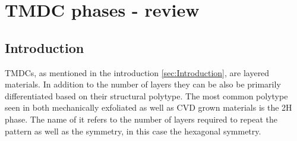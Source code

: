 \section{TMDC phases - review}

\subsection{Introduction}

TMDCs, as mentioned in the introduction \ref{sec:Introduction}, are layered materials. In addition to the number of layers they can be also be primarily differentiated based on their structural polytype. The most common polytype seen in both mechanically exfoliated as well as CVD grown materials is the 2H phase. The name of it refers to the number of layers required to repeat the pattern as well as the symmetry, in this case the hexagonal symmetry. 

